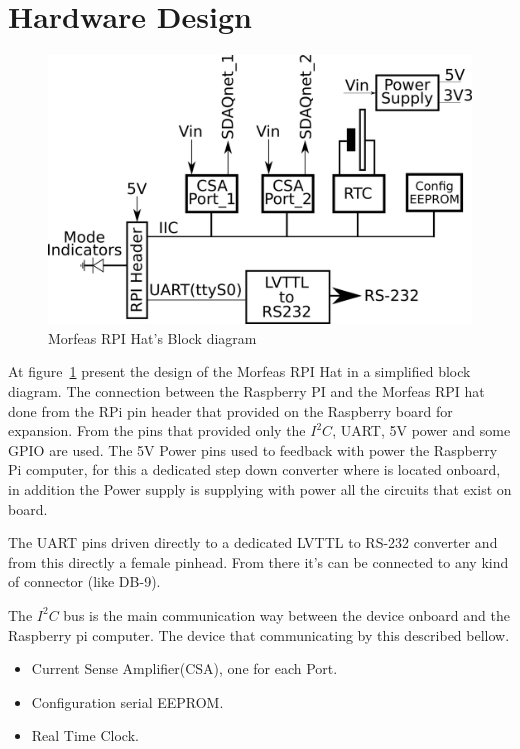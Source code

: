 \section{Hardware Design}
\begin{figure}[h]
	\centering
	\includegraphics[width=\linewidth,angle=0]{./Artwork/System.png}
	\caption{Morfeas RPI Hat's Block diagram}
	\label{fig:block}
\end{figure}

At figure~\ref{fig:block} present the design of the Morfeas RPI Hat in a simplified block diagram. The connection between the Raspberry PI and the Morfeas RPI hat done
from the RPi pin header that provided on the Raspberry board for expansion. From the pins that provided only the $I^2C$, UART, 5V power and some GPIO are used.
The 5V Power pins used to feedback with power the Raspberry Pi computer, for this a dedicated step down converter where is located onboard,
in addition the Power supply is supplying with power all the circuits that exist on board.

The UART pins driven directly to a dedicated LVTTL to RS-232 converter and from this directly a female pinhead. From there it's can be connected to any kind of connector
(like DB-9).

The $I^2C$ bus is the main communication way between the device onboard and the Raspberry pi computer. The device that communicating by this described bellow.
\begin{itemize}
	\item Current Sense Amplifier(CSA), one for each Port.
	\item Configuration serial EEPROM.
	\item Real Time Clock.
\end{itemize}

